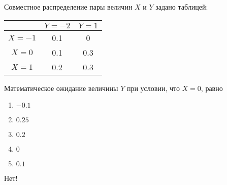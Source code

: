\documentclass[t]{beamer}
\begin{document}
 \begin{frame} \label{14-No} 
\begin{block}{14} 

Совместное распределение пары величин $X$ и $Y$ задано таблицей:

\begin{center}
\begin{tabular}{c|cc}
 & $Y=-2$ & $Y=1$ \\
\hline
$X=-1$ & 0.1 & 0 \\
$X=0$ & 0.1 & 0.3 \\
$X=1$ & 0.2 & 0.3 \\
\end{tabular}
\end{center}
\vspace{0.2cm} 
 
 Математическое ожидание величины $Y$ при условии, что $X=0$, равно
 
 \end{block} 
\begin{enumerate} 
\item[] \hyperlink{14-No}{\beamergotobutton{} $-0.1$}
\item[] \hyperlink{14-Yes}{\beamergotobutton{} $0.25$}
\item[] \hyperlink{14-No}{\beamergotobutton{} $0.2$}
\item[] \hyperlink{14-No}{\beamergotobutton{} $0$}
\item[] \hyperlink{14-No}{\beamergotobutton{} $0.1$}
\end{enumerate} 

 \alert{Нет!} 
\end{frame} 
\end{document}
